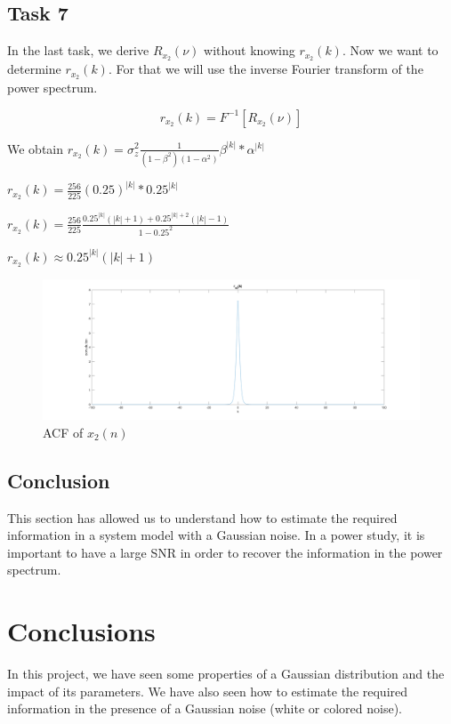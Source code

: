 \documentclass[onecolumn, 12pt]{IEEEtran}
\begin{document}
\subsection*{Task 7}

In the last task, we derive $R_{x_2}(\nu)$ without knowing $r_{x_2}(k)$. Now we want to determine $r_{x_2}(k)$. For that we will use the inverse Fourier transform of the power spectrum.

\begin{equation} \label{eq:Eq8}
	r_{x_2}(k) = F^{-1}[R_{x_2}(\nu)]
\end{equation}

\begin{multicols}{2}
We obtain $r_{x_2}(k) = \sigma_z^2 \frac{1}{(1-\beta^2)(1-\alpha^2)} \beta^{|k|}*\alpha^{|k|}$

$r_{x_2}(k) = \frac{256}{225}(0.25)^{|k|}*0.25^{|k|}$

$r_{x_2}(k) = \frac{256}{225} \frac{0.25^{|k|}(|k| + 1) + 0.25^{|k| + 2}(|k|-1)}{1 - 0.25^2}$

$r_{x_2}(k) \approx 0.25^{|k|} (|k|+1)$
\begin{figure}[H]
	\centering
	\includegraphics[scale = 0.11]{Task7.png}
	\caption{ACF of $x_2(n)$}
\label{fig:Fig7}
\end{figure}
\end{multicols}

\subsection*{Conclusion}

This section has allowed us to understand how to estimate the required information in a system model with a Gaussian noise. In a power study, it is important to have a large SNR in order to recover the information in the power spectrum.

\section{Conclusions}
In this project, we have seen some properties of a Gaussian distribution and the impact of its parameters. We have also seen how to estimate the required information in the presence of a Gaussian noise (white or colored noise).
\end{document}
